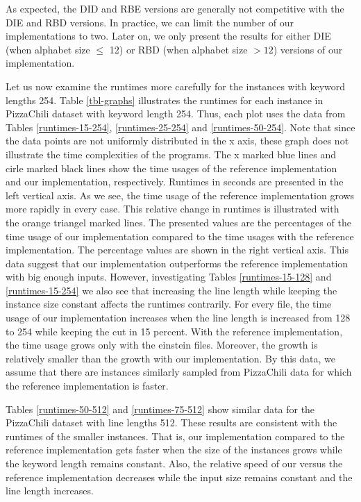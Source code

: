 \documentclass[english,twoside,censored,csm,algorithms-track-2020]{HYthesisML}
\theoremstyle{plain}
\theoremstyle{definition}
\begin{document}
As expected, the DID and RBE versions are generally not competitive with the DIE
and RBD versions. In practice, we can limit the number of our implementations to two.
Later on, we only present the results for either DIE (when alphabet size $\leq$ 12)
or RBD (when alphabet size $>12$) versions of our implementation.

Let us now examine the runtimes more carefully for the instances with keyword lengths 254.
Table \ref{tbl-graphs} illustrates the runtimes for each instance in PizzaChili dataset
with keyword length 254.
Thus, each plot uses the data from Tables
\ref{runtimes-15-254}, \ref{runtimes-25-254} and \ref{runtimes-50-254}.
Note that since the data points are not uniformly distributed in the x axis,
these graph does not illustrate the time complexities of the programs. 
The x marked blue lines and cirle marked black lines show the time usages of the reference
implementation and our implementation, respectively. Runtimes in seconds are presented in the
left vertical axis. As we see, the time usage of the reference implementation grows
more rapidly in every case. This relative change in runtimes is illustrated with
the orange triangel marked lines. The presented values are the percentages of the
time usage of our implementation compared to the time usages with the reference
implementation. The percentage values are shown in the right vertical axis.
This data suggest that our implementation outperforms the reference implementation
with big enough inputs. However, investigating Tables \ref{runtimes-15-128} and
\ref{runtimes-15-254} we also see
that increasing the line length while keeping the instance size constant affects
the runtimes contrarily. For every file, the time usage of our implementation
increases when the line length is increased from 128 to 254 while keeping the
cut in 15 percent. With the reference implementation, the time usage grows only
with the einstein files. Moreover, the growth is relatively smaller than the growth with
our implementation. By this data, we assume that there are instances similarly sampled
from PizzaChili data for which the reference implementation is faster.

Tables \ref{runtimes-50-512} and \ref{runtimes-75-512} show similar data for the PizzaChili
dataset with line lengths 512. These results are consistent with the runtimes of the smaller instances.
That is, our implementation compared to the reference implementation gets faster when the size of
the instances grows while the keyword length remains constant. Also, the relative speed of our
versus the reference implementation decreases while the input size remains constant and the
line length increases. 
\end{document}
